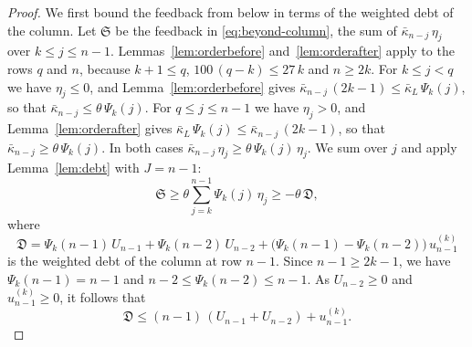 \documentclass{amsart}
\theoremstyle{definition}
\theoremstyle{remark}
\numberwithin{equation}{section}
\begin{document}
\begin{proof}
We first bound the feedback from below in terms of the weighted debt of the
column. Let $\mathfrak S$ be the feedback in \eqref{eq:beyond-column}, the
sum of $\bar\kappa_{n-j}\,\eta_j$ over $k\le j\le n-1$.
Lemmas~\ref{lem:orderbefore} and~\ref{lem:orderafter} apply to the rows $q$
and $n$, because $k+1\le q$, $100\,(q-k)\le27\,k$ and $n\ge2k$. For
$k\le j<q$ we have $\eta_j\le0$, and Lemma~\ref{lem:orderbefore} gives
$\bar\kappa_{n-j}\,(2k-1)\le\bar\kappa_L\,\Psi_k(j)$, so that
$\bar\kappa_{n-j}\le\theta\,\Psi_k(j)$. For $q\le j\le n-1$ we have
$\eta_j>0$, and Lemma~\ref{lem:orderafter} gives
$\bar\kappa_L\,\Psi_k(j)\le\bar\kappa_{n-j}\,(2k-1)$, so that
$\bar\kappa_{n-j}\ge\theta\,\Psi_k(j)$. In both cases
$\bar\kappa_{n-j}\,\eta_j\ge\theta\,\Psi_k(j)\,\eta_j$. We sum over $j$ and
apply Lemma~\ref{lem:debt} with $J=n-1$:
\begin{equation}\label{eq:beyond-feedback}
\mathfrak S\ge\theta\sum_{j=k}^{n-1}\Psi_k(j)\,\eta_j\ge-\theta\,\mathfrak D,
\end{equation}
where
\[
\mathfrak D=\Psi_k(n-1)\,U_{n-1}+\Psi_k(n-2)\,U_{n-2}
+\bigl(\Psi_k(n-1)-\Psi_k(n-2)\bigr)\,u^{(k)}_{n-1}
\]
is the weighted debt of the column at row $n-1$. Since $n-1\ge2k-1$, we
have $\Psi_k(n-1)=n-1$ and $n-2\le\Psi_k(n-2)\le n-1$. As $U_{n-2}\ge0$ and
$u^{(k)}_{n-1}\ge0$, it follows that
\begin{equation}\label{eq:beyond-debt-rows}
\mathfrak D\le(n-1)\,(U_{n-1}+U_{n-2})+u^{(k)}_{n-1} .
\end{equation}


\end{proof}
\end{document}
